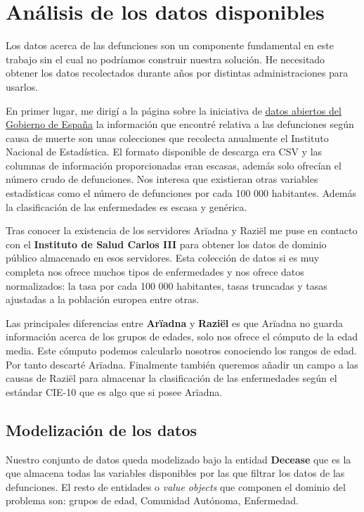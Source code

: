 \chapter{Análisis de los datos disponibles}

Los datos acerca de las defunciones son un componente fundamental en este trabajo sin
el cual no podríamos construir nuestra solución. He necesitado obtener los datos recolectados
durante años por distintas administraciones para usarlos.

En primer lugar, me dirigí a la página sobre la iniciativa de \href{https://datos.gob.es/}{datos abiertos del Gobierno de España}
la información que encontré relativa a las defunciones
según causa de muerte son unas colecciones que recolecta anualmente el Instituto
Nacional de Estadística. El formato disponible de descarga era CSV y las columnas de información
proporcionadas eran escasas, además solo ofrecían el número crudo de defunciones. Nos interesa que existieran
otras variables estadísticas como el número de defunciones por cada 100 000 habitantes. Además la clasificación de
las enfermedades es escasa y genérica.

Tras conocer la existencia de los servidores Arïadna y Raziël me puse en contacto con el \textbf{Instituto de Salud Carlos
III} para obtener los datos de dominio público almacenado en esos servidores. Esta colección de datos si es muy completa
nos ofrece muchos tipos de enfermedades y nos ofrece datos normalizados: la tasa por cada 100 000 habitantes, tasas truncadas y
tasas ajustadas a la población europea entre otras.

Las principales diferencias entre \textbf{Arïadna} y \textbf{Raziël} es que Arïadna no guarda información acerca
de los grupos de edades, solo nos ofrece el cómputo de la edad media. Este cómputo podemos calcularlo nosotros conociendo
los rangos de edad. Por tanto descarté Arïadna.
Finalmente también queremos añadir un campo a las causas de Raziël para almacenar la clasificación de las 
enfermedades según el estándar \gls{CIE-10} que es algo que si posee Arïadna.

\section{Modelización de los datos}
Nuestro conjunto de datos queda modelizado bajo la entidad \textbf{Decease} que es la que almacena todas las variables
disponibles por las que filtrar los datos de las defunciones. El resto de entidades o \textit{value objects} que componen el dominio del problema son: grupos de edad,
Comunidad Autónoma, Enfermedad.
